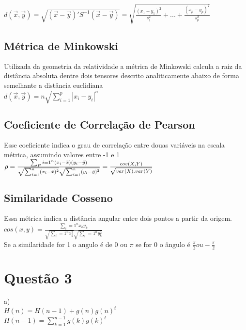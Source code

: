 \documentclass[a4paper, 12pt]{article}
\begin{document}
$d(\Vec{x},\Vec{y})=\sqrt{(\Vec{x}-\Vec{y})'S^{-1}(\Vec{x}-\Vec{y})} = \sqrt{\frac{(x_1-y_1)^2}{s_1^2}+...+\frac{(x_p-y_p)^2}{s_p^2}} $

\subsection{Métrica de Minkowski}

Utilizada da geometria da relatividade a métrica de Minkowski calcula a 
raiz da distância absoluta dentre dois tensores descrito analiticamente abaixo de forma 
semelhante a distância euclidiana\\

$d(\Vec{x},\Vec{y})=n\sqrt{\sum_{i=1}^p |x_i-y_i|^n} $

\subsection{Coeficiente de Correlação de Pearson}

Esse coeficiente indica o grau de correlação entre douas variáveis na escala métrica, assumindo valores entre -1 e 1\\

$\rho = \frac{\sum_Pi=1^n(x_i-\Bar{x})(y_i-\Bar{y})}{\sqrt{\sum_{i=1}^n(x_i-\Bar{x})^2}\sqrt{\sum_{i=1}^n(y_i-\Bar{y})^2}}
=\frac{cov(X,Y)}{\sqrt{var(X).var(Y)}}$

\subsection{Similaridade Cosseno}

Essa métrica indica a distância angular entre dois pontos a partir da origem.\\

$cos(x,y)=\frac{\sum_i=1^n x_k y_k }{\sqrt{\sum_i=1^n x_k^2}{\sqrt{\sum_i=1^n y_k^2}}} $ \\

Se a similaridade for 1 o angulo é de 0 ou $\pi$ se for 0 o ângulo é $\frac{\pi}{2} ou - \frac{\pi}{2}$


\section{Questão 3}

a)\\

$H(n)=H(n-1)+g(n)g(n)^t $ \\

$H(n-1) = \sum_{k=1}^{n-1} g(k)g(k)^t$
\end{document}
